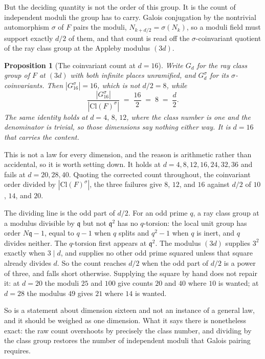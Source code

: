\documentclass[12pt,a4paper]{article}
\newtheorem{proposition}[theorem]{Proposition}
\newcommand{\Fd}{F}
\newcommand{\Cl}{\mathrm{Cl}}
\begin{document}
But the deciding quantity is not the order of this group. It is the count of
independent moduli the group has to carry. Galois conjugation by the nontrivial
automorphism $\sigma$ of $\Fd$ pairs the moduli, $N_{k+d/2} = \sigma(N_k)$, so a
moduli field must support exactly $d/2$ of them, and that count is read off the
$\sigma$-coinvariant quotient of the ray class group at the Appleby modulus
$(3d)$.

\begin{proposition}[The coinvariant count at $d=16$]
\label{prop:coinv}
Write $G_d$ for the ray class group of $\Fd$ at $(3d)$ with both infinite places
unramified, and $G_d^\sigma$ for its $\sigma$-coinvariants. Then
$|G_{16}^\sigma| = 16$, which is not $d/2 = 8$, while
\[
\frac{|G_{16}^\sigma|}{|\Cl(\Fd)^\sigma|} \;=\; \frac{16}{2} \;=\; 8 \;=\; \frac{d}{2}.
\]
The same identity holds at $d = 4,\,8,\,12$, where the class number is one and
the denominator is trivial, so those dimensions say nothing either way. It is
$d=16$ that carries the content.
\end{proposition}

This is not a law for every dimension, and the reason is arithmetic rather than
accidental, so it is worth setting down. It holds at $d = 4, 8, 12, 16, 24, 32,
36$ and fails at $d = 20, 28, 40$. Quoting the corrected count throughout, the
coinvariant order divided by $|\Cl(\Fd)^\sigma|$, the three failures give $8$,
$12$, and $16$ against $d/2$ of $10$, $14$, and $20$.

The dividing line is the odd part of $d/2$. For an odd prime $q$, a ray class
group at a modulus divisible by $\mathfrak{q}$ but not $\mathfrak{q}^2$ has no
$q$-torsion: the local unit group has order $N\mathfrak{q}-1$, equal to $q-1$
when $q$ splits and $q^2-1$ when $q$ is inert, and $q$ divides neither. The
$q$-torsion first appears at $\mathfrak{q}^2$. The modulus $(3d)$ supplies $3^2$
exactly when $3 \mid d$, and supplies no other odd prime squared unless that
square already divides $d$. So the count reaches $d/2$ when the odd part of
$d/2$ is a power of three, and falls short otherwise. Supplying the square by
hand does not repair it: at $d=20$ the moduli $25$ and $100$ give counts $20$
and $40$ where $10$ is wanted; at $d=28$ the modulus $49$ gives $21$ where $14$
is wanted.

So  is a statement about dimension sixteen and not an instance
of a general law, and it should be weighed as one dimension. What it says there
is nonetheless exact: the raw count overshoots by precisely the class number,
and dividing by the class group restores the number of independent moduli that
Galois pairing requires.
\end{document}
